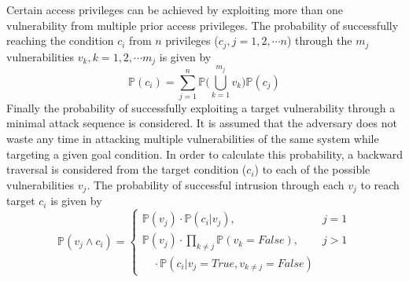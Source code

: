 Certain access privileges can be achieved by exploiting more than one vulnerability from multiple prior access privileges. The probability of successfully reaching the condition $c_i$ from $n$ privileges ($c_j,j=1,2,\cdots n$) through the $m_j$ vulnerabilities $v_k,k=1,2,\cdots m_j$ is given by
\begin{equation}
\mathbb{P}(c_i)=\sum_{j=1}^{n}{\mathbb{P}\bigg(\bigcup_{k=1}^{m_j}v_k\bigg)\mathbb{P}(c_j)}
\end{equation} 
Finally the probability of successfully exploiting a target vulnerability through a minimal attack sequence is considered. It is assumed that the adversary does not waste any time in attacking multiple vulnerabilities of the same system while targeting a given goal condition. In order to calculate this probability, a backward traversal is considered from the target condition ($c_i$) to each of the possible vulnerabilities $v_j$. The probability of successful intrusion through each $v_j$ to reach target $c_i$ is given by
\begin{equation}
\mathbb{P}(v_j\wedge c_i)=
\begin{cases}
\mathbb{P}(v_j)\cdot\mathbb{P}(c_i|v_j), &j=1\\
\mathbb{P}(v_j)\cdot\prod_{k\neq j}\mathbb{P}(v_k=False), &j>1\\
\quad\cdot\mathbb{P}(c_i|v_j=True,v_{k\neq j}=False) &
\end{cases}
\end{equation}